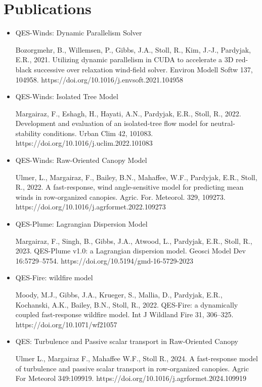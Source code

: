 \section{Publications}

\begin{itemize}

\item QES-Winds: Dynamic Parallelism Solver

Bozorgmehr, B., Willemsen, P., Gibbs, J.A., Stoll, R., Kim, J.-J., Pardyjak, E.R., 2021. Utilizing dynamic parallelism in CUDA to accelerate a 3D red-black successive over relaxation wind-field solver. Environ Modell Softw 137, 104958. https://doi.org/10.1016/j.envsoft.2021.104958

\item QES-Winds: Isolated Tree Model

Margairaz, F., Eshagh, H., Hayati, A.N., Pardyjak, E.R., Stoll, R., 2022. Development and evaluation of an isolated-tree flow model for neutral-stability conditions. Urban Clim 42, 101083. https://doi.org/10.1016/j.uclim.2022.101083

\item QES-Winds: Raw-Oriented Canopy Model

Ulmer, L., Margairaz, F., Bailey, B.N., Mahaffee, W.F., Pardyjak, E.R., Stoll, R., 2022. A fast-response, wind angle-sensitive model for predicting mean winds in row-organized canopies. Agric. For. Meteorol. 329, 109273. https://doi.org/10.1016/j.agrformet.2022.109273

\item QES-Plume: Lagrangian Dispersion Model

Margairaz, F., Singh, B., Gibbs, J.A., Atwood, L., Pardyjak, E.R., Stoll, R., 2023. QES-Plume v1.0: a Lagrangian dispersion model. Geosci Model Dev 16:5729–5754. https://doi.org/10.5194/gmd-16-5729-2023

\item QES-Fire: wildfire model

Moody, M.J., Gibbs, J.A., Krueger, S., Mallia, D., Pardyjak, E.R., Kochanski, A.K., Bailey, B.N., Stoll, R., 2022. QES-Fire: a dynamically coupled fast-response wildfire model. Int J Wildland Fire 31, 306–325. https://doi.org/10.1071/wf21057

\item QES: Turbulence and Passive scalar transport in Raw-Oriented Canopy

Ulmer L., Margairaz F., Mahaffee W.F., Stoll R., 2024. A fast-response model of turbulence and passive scalar transport in row-organized canopies. Agric For Meteorol 349:109919. https://doi.org/10.1016/j.agrformet.2024.109919


\end{itemize}


